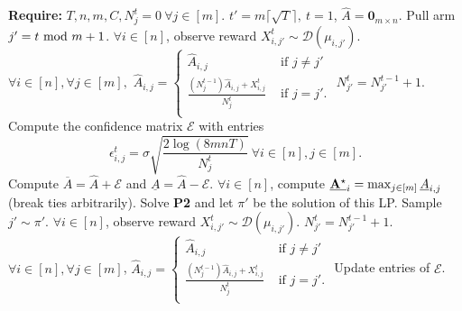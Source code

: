 \begin{algorithm}[tb]
\caption{\ouralgo}
\label{algUCB}
\begin{algorithmic}[1] %
\STATE \textbf{Require:} $T, n, m , C, N_{j}^t=0 \ \forall j \in [m].$
\STATE $t'=m\lceil \sqrt{T} \rceil, \ t=1$, $\widehat{A}=\mathbf{0}_{m\times n}$.
\STATE Pull arm $j'=t \textup{ mod } m + 1$.
\STATE $\forall i \in [n]$, observe reward $X_{i, j'}^t\sim \mathcal{D}(\mu_{i, j'})$.
\STATE $\forall i \in[n], \forall j \in[m],$ $\widehat{A}_{i,j} = 
    \begin{cases}
     \widehat{A}_{i,j} & \text{ if }  j\neq j'  \\
      \frac{(N_j^{t-1}) \widehat{A}_{i,j} + X^t_{i,j}  }{N_j^t}  & \text{ if } j =j'. \\ 
      \end{cases}$
\STATE $N_{j'}^ t = N_{j'}^ {t-1}+1.$
\ENDFOR
\STATE Compute the confidence matrix $\mathcal{E}$ with entries $$\epsilon_{i,j}^t=\sigma \sqrt{\frac{2\log{(8mnT)}}{N_j^ t}} \ \forall i\in [n], j\in [m].$$ 
\STATE Compute $\overline{A} = \widehat{A} + \mathcal{E}$ and $\underline{A} = \widehat{A} - \mathcal{E}$.
\STATE $\forall i \in [n]$, compute $\underline{\mathbf{A}^{\star}}_i = \max_{j\in [m]}\underline{A}_{i,j}$ (break ties arbitrarily).
\STATE Solve \textbf{P2} and 
     let $\pi'$ be the solution of this LP. 
\STATE Sample $j' \sim \pi'$.
\STATE $\forall i \in [n]$, observe reward $X_{i, j'}^t\sim \mathcal{D}(\mu_{i,j'})$.
\STATE $N_{j'}^ t = N_{j'}^ {t-1}+1.$
\STATE  $\forall i \in[n], \forall j \in[m]$, $\widehat{A}_{i,j} = 
    \begin{cases}
     \widehat{A}_{i,j} & \text{ if }  j\neq j'  \\
      \frac{(N_j^{t-1}) \widehat{A}_{i,j} + X_{i,j}^t  }{N_j^t}  & \text{ if } j =j'. \\ 
      \end{cases}$
\STATE Update entries of $\mathcal{E}$.
\ENDFOR
\end{algorithmic}
\end{algorithm}


